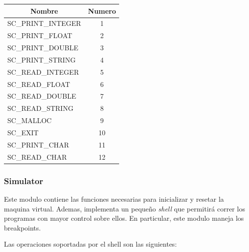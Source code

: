 \documentclass[12pt]{article}
\begin{document}
\begin{table}[H]
\centering
\begin{tabular}{@{}lc@{}}
\toprule
\multicolumn{1}{c}{Nombre} & Numero \\ \midrule
SC\_PRINT\_INTEGER                        & 1      \\
SC\_PRINT\_FLOAT                        & 2      \\
SC\_PRINT\_DOUBLE                        & 3      \\
SC\_PRINT\_STRING                       & 4      \\
SC\_READ\_INTEGER                        & 5      \\
SC\_READ\_FLOAT                        & 6      \\
SC\_READ\_DOUBLE                        & 7      \\
SC\_READ\_STRING                       & 8      \\
SC\_MALLOC                       & 9      \\
SC\_EXIT                       & 10      \\
SC\_PRINT\_CHAR                       & 11      \\
SC\_READ\_CHAR                       & 12      \\
\end{tabular}%
\end{table}

\subsubsection{Simulator}

Este modulo contiene las funciones necesarias para inicializar y resetar la maquina virtual. Ademas, implementa un pequeño \textit{shell} que permitirá correr los programas con mayor control sobre ellos. En particular, este modulo maneja los breakpoints. 

Las operaciones soportadas por el shell  son las siguientes:
\end{document}
